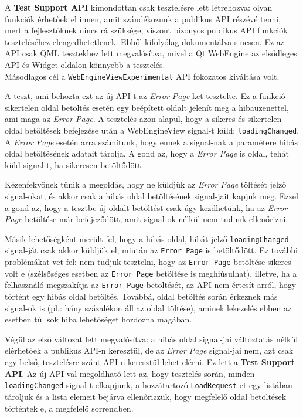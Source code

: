 \documentclass[12pt]{report}
\begin{document}
\noindent
A \textbf{Test Support API} kimondottan csak tesztelésre lett létrehozva: olyan funkciók
érhetőek el innen, amit szándékozunk a publikus API részévé tenni, mert a fejlesztőknek
nincs rá szüksége, viszont bizonyos publikus API funkciók teszteléséhez elengedhetetlenek.
Ebből kifolyólag dokumentálva sincsen.
Ez az API csak QML tesztekhez lett megvalósítva, mivel a Qt WebEngine az elsődleges API
és Widget oldalon könnyebb a tesztelés. \\
Másodlagos cél a \texttt{WebEngineViewExperimental} API fokozatos kiváltása volt.

A teszt, ami behozta ezt az új API-t az \textit{Error Page}-ket tesztelte.
Ez a funkció sikertelen oldal betöltés esetén egy beépített oldalt jelenít meg a
hibaüzenettel, ami maga az \textit{Error Page}. A tesztelés azon alapul, hogy a sikeres és
sikertelen oldal betöltések befejezése után a WebEngineView signal-t küld:
\texttt{loadingChanged}. A \textit{Error Page} esetén arra számítunk, hogy ennek a signal-nak
a paramétere hibás oldal betöltésének adatait tárolja. A gond az, hogy a \textit{Error Page}
is oldal, tehát küld signal-t, ha sikeresen betöltődött.

Kézenfekvőnek tűnik a megoldás, hogy ne küldjük az \textit{Error Page} töltését jelző
signal-okat, és akkor csak a hibás oldal betöltésének signal-jait kapjuk meg. Ezzel a gond
az, hogy a tesztbe új oldalt betöltést csak úgy kezdhetünk, ha az \textit{Error Page}
betöltése már befejeződött, amit signal-ok nélkül nem tudunk ellenőrizni.

Másik lehetőségként merült fel, hogy a hibás oldal, hibát jelző \texttt{loadingChanged}
signal-ját csak akkor küldjük el, miután az \texttt{Error Page} is betöltődött. Ez további
problémákat vet fel: nem tudjuk tesztelni, hogy az \texttt{Error Page} betöltése sikeres
volt e (szélsőséges esetben az \texttt{Error Page} betöltése is meghiúsulhat),
illetve, ha a felhasználó megszakítja az \texttt{Error Page} betöltését, az API nem értesít
arról, hogy történt egy hibás oldal betöltés. Továbbá, oldal betöltés során érkeznek más
signal-ok is (pl.: hány százalékon áll az oldal töltése), aminek lekezelés ebben az esetben
túl sok hiba lehetőséget hordozna magában.

Végül az első változat lett megvalósítva: a hibás oldal signal-jai változtatás nélkül
elérhetőek a publikus API-n keresztül, de az \textit{Error Page} signal-jai nem, azt csak
egy belső, tesztelésre szánt API-n keresztül lehet elérni. Ez lett a
\textbf{Test Support API}. Az új API-val megoldható lett az, hogy tesztelés során, minden
\texttt{loadingChanged} signal-t elkapjunk, a hozzátartozó \texttt{LoadRequest}-et egy
listában tároljuk és a lista elemeit bejárva ellenőrizzük, hogy megfelelő oldal betöltések
történtek e, a megfelelő sorrendben.
\end{document}
